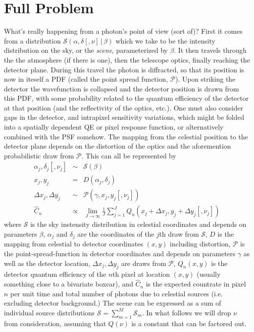 \documentclass[modern]{aastex62}
\newcommand{\given}{\,|\,}
\newcommand{\countrate}{\hat{C}}
\newcommand{\psf}{\mathcal{P}}
\newcommand{\qe}{Q}
\newcommand{\scene}{\mathcal{S}}
\begin{document}
\section{Full Problem}
What's really happening from a photon's point of view (sort of)?
First it comes from a distribution $\scene(\alpha, \delta [, \nu] \given \beta)$ which we take to be the intensity distribution on the sky, or the \emph{scene},
parameterized by $\beta$.
It then travels through the the atmosphere (if there is one), then the telescope optics, finally reaching the detector plane.
During this travel the photon is diffracted, so that its position is now in iteself a PDF (called the point spread function, $\psf$).
Upon striking the detector the wavefunction is collapsed and the detector position is drawn from this PDF, 
with some probability related to the quantum efficiency of the detector at that position (and the reflectivity of the optics, etc.).
One must also consider gaps in the detector, and intrapixel sensitivity variations, which might be folded into a spatially dependent QE or pixel response function, 
or alternatively combined with the PSF somehow.
The mapping from the celestial position to the detector plane depends on the distortion of the optics and the aforemention probabilistic draw from $\psf$.
This can all be represented by 
\begin{eqnarray}
\label{eqn:photon}
\alpha_j, \delta_j [, \nu_j] & \sim & \scene(\beta)\\
x_j, y_j & = & D(\alpha_j, \delta_j)  \nonumber \\ 
\Delta x_j, \Delta y_j & \sim & \psf(\gamma, x_j, y_j [, \nu_j]) \nonumber \\
\countrate_n & \propto & \lim_{J\to\infty} \frac{1}{J} \sum^J_{j=1} \qe_n(x_j+ \Delta x_j, y_j + \Delta y_j [, \nu_j]) \nonumber
\end{eqnarray}
where $\scene$ is the sky instensity distribution in celestial coordinates 
and depends on parameters $\beta$,
$\alpha_j$ and $\delta_j$ are the coordinates of the $j$th draw from $\scene$,
$D$ is the mapping from celestial to detector coordinates $(x, y)$ including distortion,
$\psf$ is the point-spread-function in detector coordinates and depends on parameters $\gamma$ as well as the detector location,
$\Delta x_j, \Delta y_j$ are draws from $\psf$,
$\qe_n(x, y)$ is the detector quantum efficiency of the $n$th pixel at location $(x, y)$ (usually something close to a bivariate boxcar),
and $\countrate_n$ is the expected countrate in pixel $n$ per unit time and total number of photons due to celestial sources (i.e. excluding detector background.)
The scene can be expressed as a sum of individual source distributions $\scene = \sum_{m=1}^M \scene_m$.
In what follows we will drop $\nu$ from consideration, assuming that $\qe(\nu)$ is a constant that can be factored out.
\end{document}

